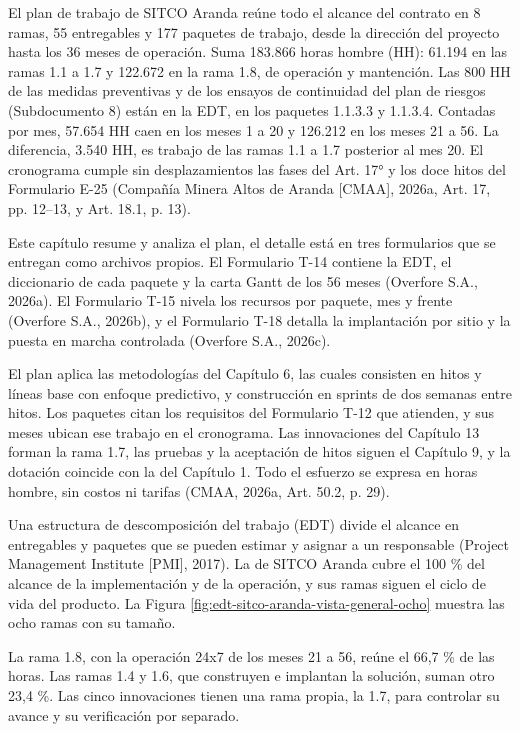 \documentclass[subdoc]{../../comun/overfore}
\begin{document}
El plan de trabajo de SITCO Aranda reúne todo el alcance del contrato en 8 ramas, 55 entregables y 177 paquetes de trabajo, desde la dirección del proyecto hasta los 36 meses de operación. Suma 183.866 horas hombre (HH): 61.194 en las ramas 1.1 a 1.7 y 122.672 en la rama 1.8, de operación y mantención. Las 800 HH de las medidas preventivas y de los ensayos de continuidad del plan de riesgos (Subdocumento 8) están en la EDT, en los paquetes 1.1.3.3 y 1.1.3.4. Contadas por mes, 57.654 HH caen en los meses 1 a 20 y 126.212 en los meses 21 a 56. La diferencia, 3.540 HH, es trabajo de las ramas 1.1 a 1.7 posterior al mes 20. El cronograma cumple sin desplazamientos las fases del Art. 17° y los doce hitos del Formulario E-25 (Compañía Minera Altos de Aranda [CMAA], 2026a, Art. 17, pp. 12–13, y Art. 18.1, p. 13).

Este capítulo resume y analiza el plan, el detalle está en tres formularios que se entregan como archivos propios. El Formulario T-14 contiene la EDT, el diccionario de cada paquete y la carta Gantt de los 56 meses (Overfore S.A., 2026a). El Formulario T-15 nivela los recursos por paquete, mes y frente (Overfore S.A., 2026b), y el Formulario T-18 detalla la implantación por sitio y la puesta en marcha controlada (Overfore S.A., 2026c).

El plan aplica las metodologías del Capítulo 6, las cuales consisten en hitos y líneas base con enfoque predictivo, y construcción en sprints de dos semanas entre hitos. Los paquetes citan los requisitos del Formulario T-12 que atienden, y sus meses ubican ese trabajo en el cronograma. Las innovaciones del Capítulo 13 forman la rama 1.7, las pruebas y la aceptación de hitos siguen el Capítulo 9, y la dotación coincide con la del Capítulo 1. Todo el esfuerzo se expresa en horas hombre, sin costos ni tarifas (CMAA, 2026a, Art. 50.2, p. 29).

Una estructura de descomposición del trabajo (EDT) divide el alcance en entregables y paquetes que se pueden estimar y asignar a un responsable (Project Management Institute [PMI], 2017). La de SITCO Aranda cubre el 100 \% del alcance de la implementación y de la operación, y sus ramas siguen el ciclo de vida del producto. La Figura \ref{fig:edt-sitco-aranda-vista-general-ocho} muestra las ocho ramas con su tamaño.

La rama 1.8, con la operación 24x7 de los meses 21 a 56, reúne el 66,7 \% de las horas. Las ramas 1.4 y 1.6, que construyen e implantan la solución, suman otro 23,4 \%. Las cinco innovaciones tienen una rama propia, la 1.7, para controlar su avance y su verificación por separado.
\end{document}
